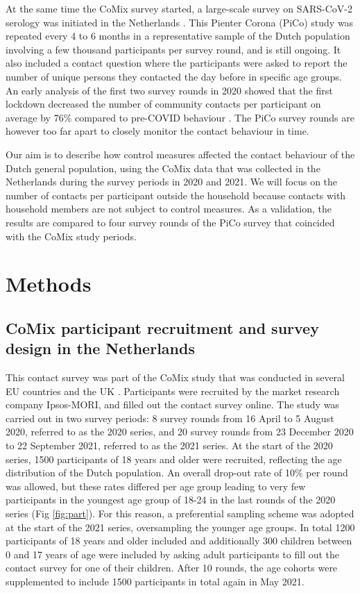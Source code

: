 \documentclass[fleqn,10pt]{wlscirep}
\begin{document}
At the same time the CoMix survey started, a large-scale survey on SARS-CoV-2 serology was initiated in the Netherlands \cite{Vos_2021}. This Pienter Corona (PiCo) study was repeated every 4 to 6 months in a representative sample of the Dutch population involving a few thousand participants per survey round, and is still ongoing. It also included a contact question where the participants were asked to report the number of unique persons they contacted the day before in specific age groups. An early analysis of the first two survey rounds in 2020 showed that the first lockdown decreased the number of community contacts per participant on average by 76\% compared to pre-COVID behaviour \cite{Backer_2021}. The PiCo survey rounds are however too far apart to closely monitor the contact behaviour in time.

Our aim is to describe how control measures affected the contact behaviour of the Dutch general population, using the CoMix data that was collected in the Netherlands during the survey periods in 2020 and 2021. We will focus on the number of contacts per participant outside the household because contacts with household members are not subject to control measures. As a validation, the results are compared to four survey rounds of the PiCo survey that coincided with the CoMix study periods.


\section*{Methods}

\subsection*{CoMix participant recruitment and survey design in the Netherlands}

This contact survey was part of the CoMix study that was conducted in several EU countries and the UK \cite{Verelst_2021}. Participants were recruited by the market research company Ipsos-MORI, and filled out the contact survey online. The study was carried out in two survey periods: 8 survey rounds from 16 April to 5 August 2020, referred to as the 2020 series, and 20 survey rounds from 23 December 2020 to 22 September 2021, referred to as the 2021 series. At the start of the 2020 series, 1500 participants of 18 years and older were recruited, reflecting the age distribution of the Dutch population. An overall drop-out rate of 10\% per round was allowed, but these rates differed per age group leading to very few participants in the youngest age group of 18-24 in the last rounds of the 2020 series (Fig \ref{fig:part}). For this reason, a preferential sampling scheme was adopted at the start of the 2021 series, oversampling the younger age groups. In total 1200 participants of 18 years and older included and additionally 300 children between 0 and 17 years of age were included by asking adult participants to fill out the contact survey for one of their children. After 10 rounds, the age cohorts were supplemented to include 1500 participants in total again in May 2021.
\end{document}

